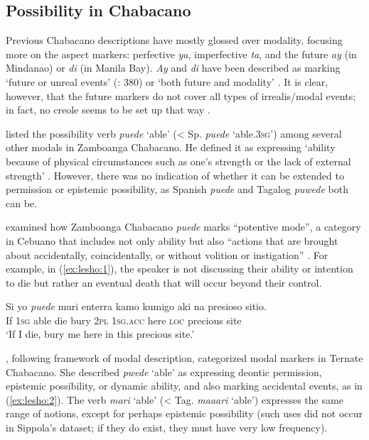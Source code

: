 \documentclass[output=paper,colorlinks,citecolor=brown]{langscibook}
\begin{document}
\subsection{Possibility in Chabacano}

Previous Chabacano descriptions have mostly glossed over modality, focusing more on the aspect markers: perfective \textit{ya}, imperfective \textit{ta}, and the future \textit{ay} (in Mindanao) or \textit{di} (in Manila Bay). \textit{Ay} and \textit{di} have been described as marking ‘future or unreal events’ (\citealt{LipskiSantoro2007}: 380) or ‘both future and modality’ \citep[58]{Lorenzino2000}. It is clear, however, that the future markers do not cover all types of irrealis\slash modal events; in fact, no creole seems to be set up that way \citep{Winford2018}. 

\begin{sloppypar}
\citet[297--301]{Frake1980} listed the possibility verb \textit{puede} ‘able’ (< Sp. \textit{puede} ‘able.3\textsc{sg}') among several other modals in Zamboanga Chabacano. He defined it as expressing ‘ability because of physical circumstances such as one’s strength or the lack of external strength’ \citep[298]{Frake1980}. However, there was no indication of whether it can be extended to permission or epistemic possibility, as Spanish \textit{puede} and Tagalog \textit{puwede} both can be. 
\end{sloppypar}

\citet{Rubino2008} examined how Zamboanga Chabacano \textit{puede} marks “potentive mode”, a category in Cebuano that includes not only ability but also “actions that are brought about accidentally, coincidentally, or without volition or instigation” \citep[279]{Rubino2008}. For example, in (\ref{ex:lesho:1}), the speaker is not discussing their ability or intention to die but rather an eventual death that will occur beyond their control.

\ea \label{ex:lesho:1}
\gll Si yo \textit{puede} muri enterra kamo kumigo aki na presioso sitio.\\
     If 1\textsc{sg} able die bury 2\textsc{pl} \textsc{1sg.acc} here \textsc{loc} precious site \\
\glt `If I die, bury me here in this precious site.' \citep[292]{Rubino2008}\\
\z

\citet{Sippola2011}, following  framework of modal description, categorized modal markers in Ternate Chabacano. She described \textit{pwede} ‘able’ as expressing deontic permission, epistemic possibility, or dynamic ability, and also marking accidental events, as in (\ref{ex:lesho:2}). The verb \textit{mari} ‘able’ (< Tag. \textit{maaari} ‘able') expresses the same range of notions, except for perhaps epistemic possibility (such uses did not occur in Sippola's dataset; if they do exist, they must have very low frequency).
\end{document}
